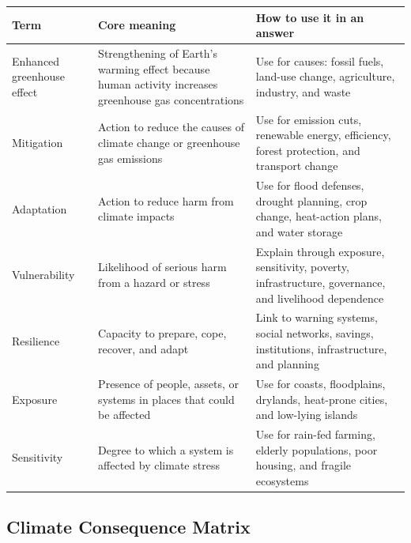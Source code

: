 \documentclass[11pt,a4paper]{article}
\begin{document}
\begin{tabularx}{\textwidth}{L{0.25\textwidth}Y Y}
\toprule
\textbf{Term} & \textbf{Core meaning} & \textbf{How to use it in an answer} \\
\midrule
Enhanced greenhouse effect & Strengthening of Earth's warming effect because
human activity increases greenhouse gas concentrations & Use for causes:
fossil fuels, land-use change, agriculture, industry, and waste \\
Mitigation & Action to reduce the causes of climate change or greenhouse gas
emissions & Use for emission cuts, renewable energy, efficiency, forest
protection, and transport change \\
Adaptation & Action to reduce harm from climate impacts & Use for flood
defenses, drought planning, crop change, heat-action plans, and water storage \\
Vulnerability & Likelihood of serious harm from a hazard or stress & Explain
through exposure, sensitivity, poverty, infrastructure, governance, and
livelihood dependence \\
Resilience & Capacity to prepare, cope, recover, and adapt & Link to warning
systems, social networks, savings, institutions, infrastructure, and planning \\
Exposure & Presence of people, assets, or systems in places that could be
affected & Use for coasts, floodplains, drylands, heat-prone cities, and
low-lying islands \\
Sensitivity & Degree to which a system is affected by climate stress & Use for
rain-fed farming, elderly populations, poor housing, and fragile ecosystems \\
\bottomrule
\end{tabularx}

\subsection{Climate Consequence Matrix}
\end{document}
